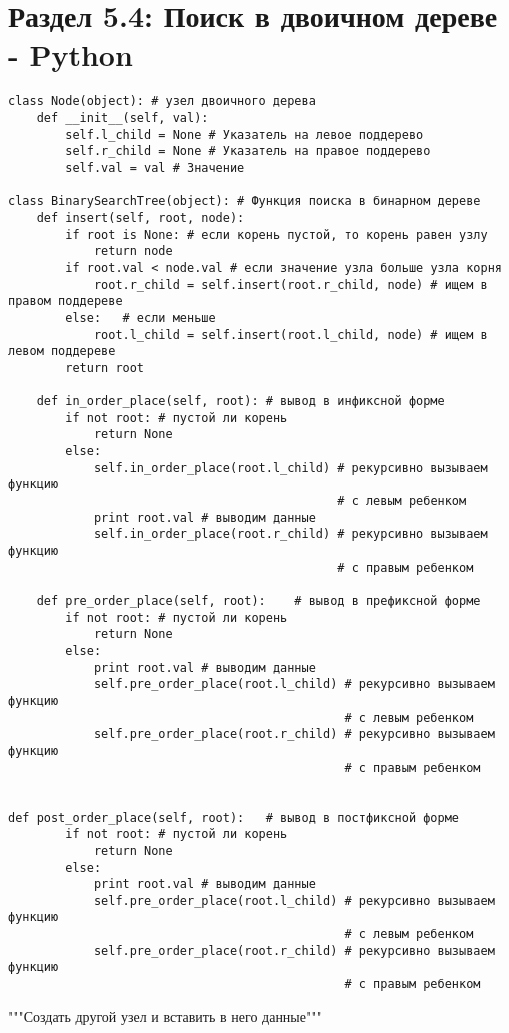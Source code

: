 \section*{Раздел 5.4: Поиск в двоичном  дереве - Python}

\vspace{\baselineskip}
\begin{tcolorbox}
\begin{verbatim}
class Node(object): # узел двоичного дерева
	def __init__(self, val):
		self.l_child = None # Указатель на левое поддерево
		self.r_child = None # Указатель на правое поддерево
		self.val = val # Значение

class BinarySearchTree(object): # Функция поиска в бинарном дереве
	def insert(self, root, node):
		if root is None: # если корень пустой, то корень равен узлу
			return node
		if root.val < node.val # если значение узла больше узла корня
			root.r_child = self.insert(root.r_child, node) # ищем в правом поддереве
		else:	# если меньше
			root.l_child = self.insert(root.l_child, node) # ищем в левом поддереве
		return root 

	def in_order_place(self, root): # вывод в инфиксной форме
		if not root: # пустой ли корень
			return None
		else:
			self.in_order_place(root.l_child) # рекурсивно вызываем функцию 
											  # с левым ребенком
			print root.val # выводим данные
			self.in_order_place(root.r_child) # рекурсивно вызываем функцию 
											  # с правым ребенком

	def pre_order_place(self, root):	# вывод в префиксной форме
		if not root: # пустой ли корень
			return None
		else:
			print root.val # выводим данные
			self.pre_order_place(root.l_child) # рекурсивно вызываем функцию 
											   # с левым ребенком
			self.pre_order_place(root.r_child) # рекурсивно вызываем функцию 
											   # с правым ребенком


def post_order_place(self, root):	# вывод в постфиксной форме
		if not root: # пустой ли корень
			return None
		else:
			print root.val # выводим данные
			self.pre_order_place(root.l_child) # рекурсивно вызываем функцию 
											   # с левым ребенком
			self.pre_order_place(root.r_child) # рекурсивно вызываем функцию 
											   # с правым ребенком

\end{verbatim}
\end{tcolorbox}

\vspace{\baselineskip}
"""Создать другой узел и вставить в него данные"""

